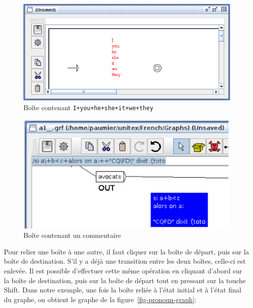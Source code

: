 \begin{figure}[!h]
\begin{center}
\includegraphics[width=14.5cm]{resources/img/fig5-4.png}
\caption{Boîte contenant
\texttt{I+you+he+she+it+we+they}\label{fig-pronoun-box}}
\end{center}
\end{figure}

\begin{figure}[!h]
\begin{center}
\includegraphics[width=12.5cm]{resources/img/fig5-4b.png}
\caption{Boîte contenant un commentaire\label{comment-box}}
\end{center}
\end{figure}


\noindent Pour relier une boîte à une autre, il faut cliquer sur la boîte de départ, puis sur la
boîte de destination.
S’il y a déjà une transition entre les deux boîtes, celle-ci est enlevée. Il est possible
d’effectuer cette même opération en cliquant d’abord sur la boîte de destination, puis sur la boîte
de départ tout en pressant sur la touche Shift.
Dans notre exemple, une fois la boîte reliée à l’état initial et à l’état final du graphe,
on obtient le graphe de la figure~\ref{fig-pronoun-graph}:

